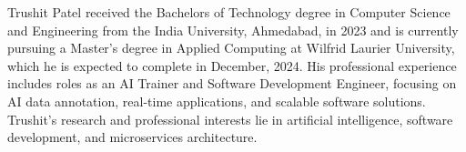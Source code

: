 \documentclass{ieeeaccess}
\begin{document}
\begin{IEEEbiography}{Trushit Patel} received the Bachelors of Technology degree in Computer Science and Engineering from the India University, Ahmedabad, in 2023 and is currently pursuing a Master's degree in Applied Computing at Wilfrid Laurier University, which he is expected to complete in December, 2024. 
	His professional experience includes roles as an AI Trainer and Software Development Engineer, focusing on AI data annotation, real-time applications, and scalable software solutions. Trushit's research and professional interests lie in artificial intelligence, software development, and microservices architecture.
	
\end{IEEEbiography}

\EOD
\end{document}
